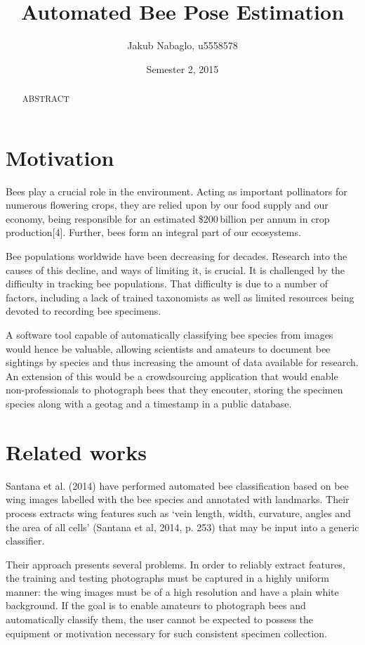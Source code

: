 \documentclass[11pt, oneside]{report}
\title{Automated Bee Pose Estimation}
\author{Jakub Nabaglo, u5558578}
\date{Semester 2, 2015}
\begin{document}
\maketitle

\begin{abstract}
    ABSTRACT
\end{abstract}

\tableofcontents\newpage

\chapter{Motivation}
    Bees play a crucial role in the environment. Acting as important pollinators for numerous flowering crops, they are relied upon by our food supply and our economy, being responsible for an estimated \$200\,billion per annum in crop production[4]. Further, bees form an integral part of our ecosystems.

    Bee populations worldwide have been decreasing for decades. Research into the causes of this decline, and ways of limiting it, is crucial. It is challenged by the difficulty in tracking bee populations. That difficulty is due to a number of factors, including a lack of trained taxonomists as well as limited resources being devoted to recording bee specimens.

    A software tool capable of automatically classifying bee species from images would hence be valuable, allowing scientists and amateurs to document bee sightings by species and thus increasing the amount of data available for research. An extension of this would be a crowdsourcing application that would enable non-professionals to photograph bees that they encouter, storing the specimen species along with a geotag and a timestamp in a public database.

\chapter{Related works}
    Santana et al. (2014) have performed automated bee classification based on bee wing images labelled with the bee species and annotated with landmarks. Their process extracts wing features such as `vein length, width, curvature, angles and the area of all cells' (Santana et al, 2014, p. 253) that may be input into a generic classifier.

    Their approach presents several problems. In order to reliably extract features, the training and testing photographs must be captured in a highly uniform manner: the wing images must be of a high resolution and have a plain white background. If the goal is to enable amateurs to photograph bees and automatically classify them, the user cannot be expected to possess the equipment or motivation necessary for such consistent specimen collection.
\end{document}
